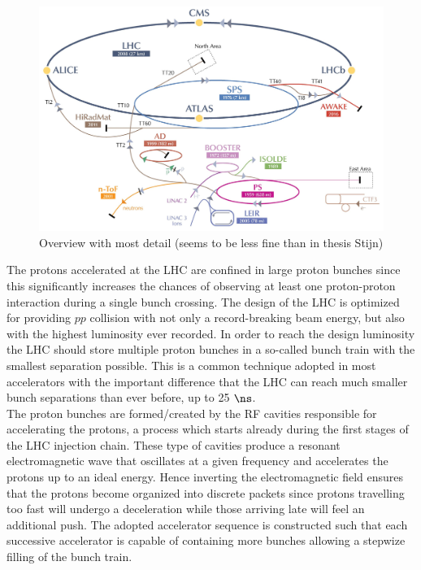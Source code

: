 \begin{figure}[h!t]
 \centering
 \includegraphics[width = 0.99 \textwidth]{Chapters/Chapter2_CERN/Figures/CERNAcceleratorComplex_Detail.jpg}
 \caption{Overview with most detail (seems to be less fine than in thesis Stijn)} \label{fig::LHCChain}
\end{figure}

The protons accelerated at the LHC are confined in large proton bunches since this significantly increases the chances of observing at least one proton-proton interaction during a single bunch crossing. 
The design of the LHC is optimized for providing $pp$ collision with not only a record-breaking beam energy, but also with the highest luminosity ever recorded. In order to reach the design luminosity the LHC should store multiple proton bunches in a so-called bunch train with the smallest separation possible. 
This is a common technique adopted in most accelerators with the important difference that the LHC can reach much smaller bunch separations than ever before, up to 25 $\ns$.
\\
The proton bunches are formed/created by the RF cavities responsible for accelerating the protons, a process which starts already during the first stages of the LHC injection chain.
These type of cavities produce a resonant electromagnetic wave that oscillates at a given frequency and accelerates the protons up to an ideal energy.
Hence inverting the electromagnetic field ensures that the protons become organized into discrete packets since protons travelling too fast will undergo a deceleration while those arriving late will feel an additional push.
The adopted accelerator sequence is constructed such that each successive accelerator is capable of containing more bunches allowing a stepwize filling of the bunch train.

